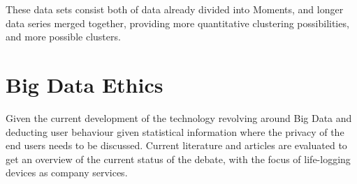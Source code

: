 These data sets consist both of data already divided into Moments, and 
longer data series merged together, providing more quantitative clustering
possibilities, and more possible clusters. 

\section{Big Data Ethics}
Given the current development of the technology revolving around Big Data
and deducting user behaviour given statistical information where the privacy 
of the end users needs to be discussed. Current literature and articles are
evaluated to get an overview of the current status of the debate, with 
the focus of life-logging devices as company services. 

